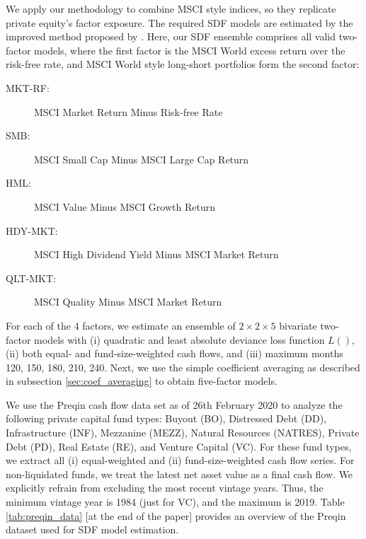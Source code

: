 \documentclass[12pt]{article}
\begin{document}
We apply our methodology to combine MSCI style indices, so they replicate private equity's factor exposure.
The required SDF models are estimated by the improved \cite{DLP12} method proposed by \cite{T20}.
Here, our SDF ensemble comprises all valid two-factor models, where the first factor is the MSCI World excess return over the risk-free rate, and MSCI World style long-short portfolios form the second factor:
\begin{description}
	\item[MKT-RF:]{MSCI Market Return Minus Risk-free Rate}
	\item[SMB:]{MSCI Small Cap Minus MSCI Large Cap Return}
	\item[HML:]{MSCI Value Minus MSCI Growth Return}
	\item[HDY-MKT:]{MSCI High Dividend Yield Minus MSCI Market Return}
	\item[QLT-MKT:]{MSCI Quality Minus MSCI Market Return}
\end{description}
For each of the 4 factors, we estimate an ensemble of $2 \times 2 \times 5$ bivariate two-factor models with (i) quadratic and least absolute deviance loss function $L()$, (ii) both equal- and fund-size-weighted cash flows, and (iii) maximum months 120, 150, 180, 210, 240.
Next, we use the simple coefficient averaging as described in subsection \ref{sec:coef_averaging} to obtain five-factor models.

We use the Preqin cash flow data set as of 26th February 2020 to analyze the following private capital fund types: 
Buyout (BO), 
Distressed Debt (DD), 
Infrastructure (INF), 
Mezzanine (MEZZ),
Natural Resources (NATRES), 
Private Debt (PD), 
Real Estate (RE), 
and Venture Capital (VC).
For these fund types, we extract all (i) equal-weighted and (ii) fund-size-weighted cash flow series.
For non-liquidated funds, we treat the latest net asset value as a final cash flow.
We explicitly refrain from excluding the most recent vintage years.
Thus, the minimum vintage year is 1984 (just for VC), and the maximum is 2019.
Table \ref{tab:preqin_data} [at the end of the paper] provides an overview of the Preqin dataset used for SDF model estimation.
\end{document}
